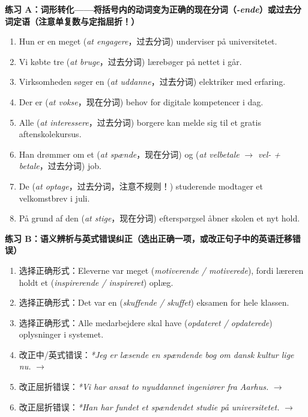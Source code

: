 \textbf{练习 A：词形转化——将括号内的动词变为正确的现在分词（\textit{-ende}）或过去分词定语（注意单复数与定指屈折！）}
\begin{enumerate}
  \item Hun er en meget \underline{\hspace{2.6cm}} (\textit{at engagere}，过去分词) underviser på universitetet.
  \item Vi købte tre \underline{\hspace{2.6cm}} (\textit{at bruge}，过去分词) lærebøger på nettet i går.
  \item Virksomheden søger en \underline{\hspace{2.6cm}} (\textit{at uddanne}，过去分词) elektriker med erfaring.
  \item Der er \underline{\hspace{2.6cm}} (\textit{at vokse}，现在分词) behov for digitale kompetencer i dag.
  \item Alle \underline{\hspace{2.6cm}} (\textit{at interessere}，过去分词) borgere kan melde sig til et gratis aftenskolekursus.
  \item Han drømmer om et \underline{\hspace{2.6cm}} (\textit{at spænde}，现在分词) og \underline{\hspace{2.6cm}} (\textit{at velbetale} $\rightarrow$ \textit{vel- + betale}，过去分词) job.
  \item De \underline{\hspace{2.6cm}} (\textit{at optage}，过去分词，注意不规则！) studerende modtager et velkomstbrev i juli.
  \item På grund af den \underline{\hspace{2.6cm}} (\textit{at stige}，现在分词) efterspørgsel åbner skolen et nyt hold.
\end{enumerate}

\textbf{练习 B：语义辨析与英式错误纠正（选出正确一项，或改正句子中的英语迁移错误）}
\begin{enumerate}
  \item 选择正确形式：Eleverne var meget \underline{\hspace{2.6cm}} (\textit{motiverende / motiverede}), fordi læreren holdt et \underline{\hspace{2.6cm}} (\textit{inspirerende / inspireret}) oplæg.
  \item 选择正确形式：Det var en \underline{\hspace{2.6cm}} (\textit{skuffende / skuffet}) eksamen for hele klassen.
  \item 选择正确形式：Alle medarbejdere skal have \underline{\hspace{2.6cm}} (\textit{opdateret / opdaterede}) oplysninger i systemet.
  \item 改正中/英式错误：\textit{*Jeg er læsende en spændende bog om dansk kultur lige nu.} $\rightarrow$
  \item 改正屈折错误：\textit{*Vi har ansat to nyuddannet ingeniører fra Aarhus.} $\rightarrow$
  \item 改正屈折错误：\textit{*Han har fundet et spændendet studie på universitetet.} $\rightarrow$
\end{enumerate}

